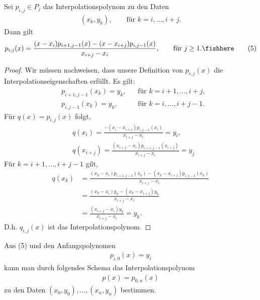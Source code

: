 \begin{prop}
\label{prop:3.3}
Sei $p_{i,j}\in P_j$ das Interpolationspolynom zu den Daten
\begin{align*}
(x_k,y_k),\qquad \text{für }k=i,\ldots,i+j.
\end{align*}
Dann gilt
\begin{align*}
p_{i,j}(x) = \frac{(x - x_i)p_{i+1,j-1}(x) -
(x-x_{i+j})p_{i,j-1}(x)}{x_{i+j}-x_i},\qquad \text{für } j\ge
1.\fishhere\tag{5}
\end{align*} %
\end{prop}
\begin{proof}
Wir müssen nachweisen, dass unsere Definition von $p_{i,j}(x)$ die
Interpolationseigenschaften erfüllt.
Es gilt:
\begin{align*}
&p_{i+1,j-1}(x_k) = y_k,&& \text{für } k = i+1,\ldots,i+j,\\
&p_{i,j-1}(x_k) = y_k,&& \text{für } k = i,\ldots,i+j-1.
\end{align*}
Für $q(x) = p_{i,j}(x)$ folgt,
\begin{align*}
&q(x_i) = \frac{-(x_i-x_{i+j})p_{i,j-1}(x_i)}{x_{i+j}-x_i} = y_i,\\
&q(x_{i+j}) = \frac{(x_{i+j}-x_{i})p_{i+1,j-1}(x_{i+j})}{x_{i+j}-x_i} = y_j
\end{align*}
Für $k=i+1,\ldots,i+j-1$ gilt,
\begin{align*}
q(x_k) &=
\frac{(x_k-x_i)p_{i+1,j-1}(x_k)-(x_k-x_{i+j})p_{i,j-1}(x_k)}{x_{i+j}-x_i}\\
&= \frac{(x_k-x_i)y_k - (x_k-x_{i+j})y_k}{x_{i+j}-x_i}\\
&= \frac{(x_{i+j}-x_i)y_k}{x_{i+j}-x_i} = y_k.
\end{align*}
D.h. $q_{i,j}(x)$ ist das Interpolationspolynom.\qedhere
\end{proof}

Aus (5) und den Anfangspolynomen 
\begin{align*}
p_{i,0}(x) = y_i
\end{align*}
kann man durch folgendes Schema das Interpolationspolynom 
\begin{align*}
p(x) = p_{0,n}(x)
\end{align*}
zu den Daten $(x_0,y_0),\ldots,(x_n,y_n)$ bestimmen.

